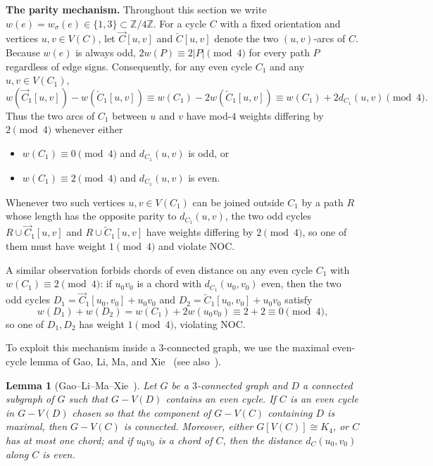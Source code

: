 \documentclass[10pt,letterpaper]{article}
\theoremstyle{zetaplain}
\newtheorem{lemma}[theorem]{Lemma}
\theoremstyle{zetadef}
\theoremstyle{remark}
\numberwithin{equation}{section}
\newcommand{\vecC}[1]{\overrightarrow{#1}}
\newcommand{\revC}[1]{\overleftarrow{#1}}
\begin{document}
\noindent\textbf{The parity mechanism.}
Throughout this section we write $w(e) = w_\sigma(e) \in \{1, 3\} \subset \mathbb{Z}/4\mathbb{Z}$. For a cycle $C$ with a fixed orientation and vertices $u, v \in V(C)$, let $\vecC{C}[u, v]$ and $\revC{C}[u, v]$ denote the two $(u, v)$-arcs of $C$. Because $w(e)$ is always odd, $2w(P) \equiv 2|P| \pmod 4$ for every path $P$ regardless of edge signs. Consequently, for any even cycle $C_1$ and any $u, v \in V(C_1)$,
\begin{equation}\label{eq:parity}
  w(\vecC{C}_1[u, v]) - w(\revC{C}_1[u, v]) \equiv w(C_1) - 2w(\revC{C}_1[u, v]) \equiv w(C_1) + 2d_{C_1}(u, v) \pmod 4.
\end{equation}
Thus the two arcs of $C_1$ between $u$ and $v$ have mod-$4$ weights differing by $2 \pmod 4$ whenever either
\begin{itemize}
  \item $w(C_1) \equiv 0 \pmod 4$ and $d_{C_1}(u, v)$ is odd, or
  \item $w(C_1) \equiv 2 \pmod 4$ and $d_{C_1}(u, v)$ is even.
\end{itemize}
Whenever two such vertices $u, v \in V(C_1)$ can be joined outside $C_1$ by a path $R$ whose length has the opposite parity to $d_{C_1}(u, v)$, the two odd cycles $R \cup \vecC{C}_1[u, v]$ and $R \cup \revC{C}_1[u, v]$ have weights differing by $2 \pmod 4$, so one of them must have weight $1 \pmod 4$ and violate NOC.

A similar observation forbids chords of even distance on any even cycle $C_1$ with $w(C_1) \equiv 2 \pmod 4$: if $u_0 v_0$ is a chord with $d_{C_1}(u_0, v_0)$ even, then the two odd cycles $D_1 = \vecC{C}_1[u_0, v_0] + u_0 v_0$ and $D_2 = \revC{C}_1[u_0, v_0] + u_0 v_0$ satisfy
\[
  w(D_1) + w(D_2) = w(C_1) + 2w(u_0 v_0) \equiv 2 + 2 \equiv 0 \pmod 4,
\]
so one of $D_1, D_2$ has weight $1 \pmod 4$, violating NOC.

To exploit this mechanism inside a $3$-connected graph, we use the maximal even-cycle lemma of Gao, Li, Ma, and Xie~\cite{GLMX24} (see also~\cite[Lemma~5.1]{BGLP26}).

\begin{lemma}[Gao--Li--Ma--Xie~\cite{GLMX24}]\label{lem:GLMX}
Let $G$ be a $3$-connected graph and $D$ a connected subgraph of $G$ such that $G - V(D)$ contains an even cycle. If $C$ is an even cycle in $G - V(D)$ chosen so that the component of $G - V(C)$ containing $D$ is maximal, then $G - V(C)$ is connected. Moreover, either $G[V(C)] \cong K_4$, or $C$ has at most one chord; and if $u_0 v_0$ is a chord of $C$, then the distance $d_C(u_0, v_0)$ along $C$ is even.
\end{lemma}
\end{document}
